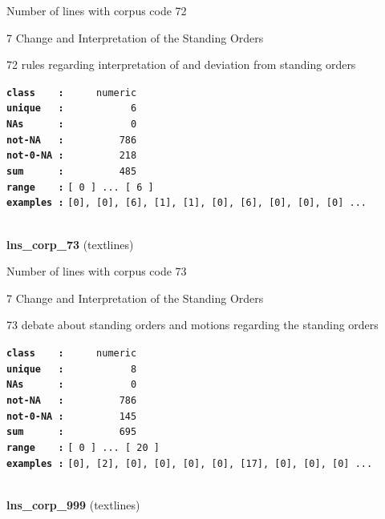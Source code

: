 \documentclass[]{article}
\begin{document}
Number of lines with corpus code 72

7 Change and Interpretation of the Standing Orders

72 rules regarding interpretation of and deviation from standing orders

\textbf{\texttt{class\ \ \ \ :}} \texttt{~~~~~numeric}\\
\textbf{\texttt{unique\ \ \ :}} \texttt{~~~~~~~~~~~6}\\
\textbf{\texttt{NAs\ \ \ \ \ \ :}} \texttt{~~~~~~~~~~~0}\\
\textbf{\texttt{not-NA\ \ \ :}} \texttt{~~~~~~~~~786}\\
\textbf{\texttt{not-0-NA\ :}} \texttt{~~~~~~~~~218}\\
\textbf{\texttt{sum\ \ \ \ \ \ :}} \texttt{~~~~~~~~~485}\\
\textbf{\texttt{range\ \ \ \ :}}
\texttt{{[}\ 0\ {]}\ ...\ {[}\ 6\ {]}}\\
\textbf{\texttt{examples\ :}}
\texttt{{[}0{]},\ {[}0{]},\ {[}6{]},\ {[}1{]},\ {[}1{]},\ {[}0{]},\ {[}6{]},\ {[}0{]},\ {[}0{]},\ {[}0{]}\ ...}\\

~

\textbf{lns\_corp\_73} (textlines)

Number of lines with corpus code 73

7 Change and Interpretation of the Standing Orders

73 debate about standing orders and motions regarding the standing
orders

\textbf{\texttt{class\ \ \ \ :}} \texttt{~~~~~numeric}\\
\textbf{\texttt{unique\ \ \ :}} \texttt{~~~~~~~~~~~8}\\
\textbf{\texttt{NAs\ \ \ \ \ \ :}} \texttt{~~~~~~~~~~~0}\\
\textbf{\texttt{not-NA\ \ \ :}} \texttt{~~~~~~~~~786}\\
\textbf{\texttt{not-0-NA\ :}} \texttt{~~~~~~~~~145}\\
\textbf{\texttt{sum\ \ \ \ \ \ :}} \texttt{~~~~~~~~~695}\\
\textbf{\texttt{range\ \ \ \ :}}
\texttt{{[}\ 0\ {]}\ ...\ {[}\ 20\ {]}}\\
\textbf{\texttt{examples\ :}}
\texttt{{[}0{]},\ {[}2{]},\ {[}0{]},\ {[}0{]},\ {[}0{]},\ {[}0{]},\ {[}17{]},\ {[}0{]},\ {[}0{]},\ {[}0{]}\ ...}\\

~

\textbf{lns\_corp\_999} (textlines)
\end{document}
